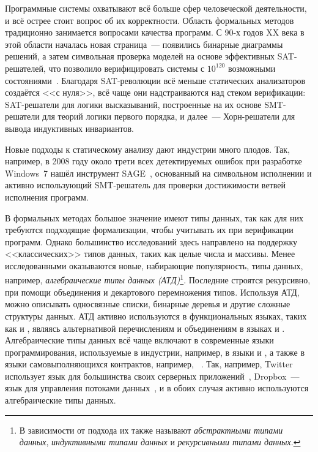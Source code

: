 {\actuality}
Программные системы охватывают всё больше сфер человеческой деятельности, и всё острее стоит вопрос об их корректности.
Область формальных методов традиционно занимается вопросами качества программ. С 90-х годов XX века в этой области началась новая страница~--- появились бинарные диаграммы решений, а затем символьная проверка моделей на основе эффективных SAT-решателей, что позволило верифицировать системы с \(10^{120}\) возможными состояниями~\cite{10.1007/3-540-61474-5_93}. Благодаря SAT-революции всё меньше статических анализаторов создаётся <<с нуля>>, всё чаще они  надстраиваются над стеком верификации: SAT-решатели для логики высказываний, построенные на их основе SMT-решатели для теорий логики первого порядка, и далее~--- Хорн-решатели для вывода индуктивных инвариантов.

Новые подходы к статическому анализу дают индустрии много плодов.
Так, например, в 2008 году около трети всех детектируемых ошибок при разработке Windows~7 нашёл инструмент SAGE~\cite{10.1145/2090147.2094081}, основанный на символьном исполнении и активно использующий SMT-решатель для проверки достижимости ветвей исполнения программ.

 В формальных методах большое значение имеют типы данных, так как для них требуются подходящие формализации, чтобы учитывать их при верификации программ. Однако большинство исследований здесь направлено на поддержку <<классических>> типов данных, таких как целые числа и массивы. Менее исследованными оказываются новые, набирающие популярность, типы данных, например, \emph{алгебраические типы данных (АТД)}\footnote{В зависимости от подхода их также называют \emph{абстрактными типами данных}, \emph{индуктивными типами данных} и \emph{рекурсивными типами данных}.}.
Последние строятся рекурсивно, при помощи объединения и декартового перемножения типов. Используя АТД, можно описывать  односвязные списки,  бинарные деревья и другие сложные структуры данных.  АТД активно используются в функциональных языках, таких как \haskell{} и \ocaml{},  являясь альтернативой перечислениям и объединениям в языках \clanguage{} и \cplusplus{}. Алгебраические типы данных всё чаще включают в современные языки программирования, используемые в индустрии, например, в языки \rust{} и \scala{}, а также в языки самовыполняющихся контрактов, например, \solidity{}~\cite{8327565}. Так, например, Twitter использует язык \scala{} для большинства своих серверных приложений~\cite{10.1145/1900160.1900170}, Dropbox~--- язык \rust{} для управления потоками данных~\cite{dropboxRust}, и в обоих случая активно используются алгебраические типы данных.

